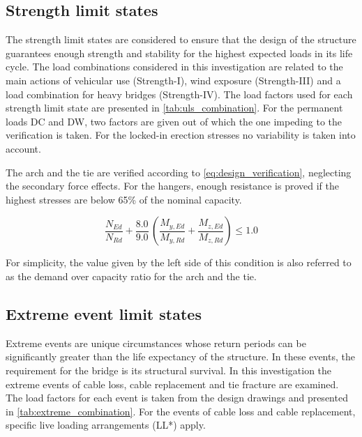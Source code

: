\subsection{Strength limit states}
The strength limit states are considered to ensure that the design of the structure guarantees enough strength and stability for the highest expected loads in its life cycle. The load combinations considered in this investigation are related to the main actions of vehicular use (Strength-I), wind exposure (Strength-III) and a load combination for heavy bridges (Strength-IV). The load factors used for each strength limit state are presented in \cref{tab:uls_combination}. For the permanent loads DC and DW, two factors are given out of which the one impeding to the verification is taken. For the locked-in erection stresses no variability is taken into account.



The arch and the tie are verified according to \cref{eq:design_verification}, neglecting the secondary force effects. For the hangers, enough resistance is proved if the highest stresses are below 65\% of the nominal capacity. 

\begin{equation}
    \frac{N_{Ed}}{N_{Rd}} + \frac{8.0}{9.0}\, \left(\frac{M_{y,Ed}}{M_{y,Rd}}+\frac{M_{z,Ed}}{M_{z,Rd}} \right) \leq 1.0
    \label{eq:design_verification}
\end{equation}

For simplicity, the value given by the left side of this condition is also referred to as the demand over capacity ratio for the arch and the tie.

\subsection{Extreme event limit states}
Extreme events are unique circumstances whose return periods can be significantly greater than the life expectancy of the structure. In these events, the requirement for the bridge is its structural survival. In this investigation the extreme events of cable loss, cable replacement and tie fracture are examined. The load factors for each event is taken from the design drawings and presented in \cref{tab:extreme_combination}. For the events of cable loss and cable replacement, specific live loading arrangements (LL*) apply.

